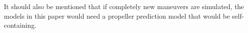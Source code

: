 %
%

It should also be mentioned that if completely new maneuvers are simulated, the models in this paper would need a propeller prediction model that would be self-containing.
